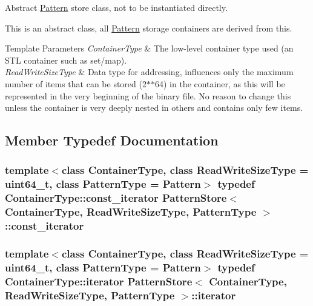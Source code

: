Abstract \hyperlink{classPattern}{Pattern} store class, not to be instantiated directly. 

This is an abstract class, all \hyperlink{classPattern}{Pattern} storage containers are derived from this. 
\begin{DoxyTemplParams}{Template Parameters}
{\em Container\+Type} & The low-\/level container type used (an S\+T\+L container such as set/map). \\
\hline
{\em Read\+Write\+Size\+Type} & Data type for addressing, influences only the maximum number of items that can be stored (2$\ast$$\ast$64) in the container, as this will be represented in the very beginning of the binary file. No reason to change this unless the container is very deeply nested in others and contains only few items. \\
\hline
\end{DoxyTemplParams}


\subsection{Member Typedef Documentation}
\hypertarget{classPatternStore_a605a2f6e75381eac263bcc36976c1377}{}
\subsubsection[{const\+\_\+iterator}]{\setlength{\rightskip}{0pt plus 5cm}template$<$class Container\+Type, class Read\+Write\+Size\+Type = uint64\+\_\+t, class Pattern\+Type = Pattern$>$ typedef Container\+Type\+::const\+\_\+iterator {\bf Pattern\+Store}$<$ Container\+Type, Read\+Write\+Size\+Type, {\bf Pattern\+Type} $>$\+::{\bf const\+\_\+iterator}}\label{classPatternStore_a605a2f6e75381eac263bcc36976c1377}
\hypertarget{classPatternStore_ac0c35c2f256738575a5fc6932546d9dc}{}
\subsubsection[{iterator}]{\setlength{\rightskip}{0pt plus 5cm}template$<$class Container\+Type, class Read\+Write\+Size\+Type = uint64\+\_\+t, class Pattern\+Type = Pattern$>$ typedef Container\+Type\+::iterator {\bf Pattern\+Store}$<$ Container\+Type, Read\+Write\+Size\+Type, {\bf Pattern\+Type} $>$\+::{\bf iterator}}\label{classPatternStore_ac0c35c2f256738575a5fc6932546d9dc}


